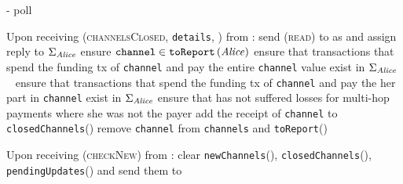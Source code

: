 \begin{systembox}{\fpaynet - poll}
\begin{algorithmic}[1]
    \State Upon receiving (\textsc{channelsClosed}, \texttt{details}, \alice)
    from \simulator:
    \Indent
      \State send (\textsc{read}) to \ledger{} as \alice{} and assign reply to
      $\Sigma_{\mathit{Alice}}$
        \State ensure $\mathtt{channel} \in
        \mathtt{toReport}\left(\mathit{Alice}\right)$
          \State ensure that transactions that spend the funding tx of
          \texttt{channel} and pay \alice{} the entire \texttt{channel} value
          exist in $\Sigma_{\mathit{Alice}}$
        \Else \ 
          \State ensure that transactions that spend the funding tx of
          \texttt{channel} and pay \alice{} the her part in \texttt{channel}
          exist in $\Sigma_{\mathit{Alice}}$
          \State ensure that \alice{} has not suffered losses for multi-hop
          payments where she was not the payer
        \EndIf
        \State add the receipt of \texttt{channel} to
        \texttt{closedChannels}(\alice)
        \State remove \texttt{channel} from \texttt{channels} and
        \texttt{toReport}(\alice)
      \EndFor
    \EndIndent
    \State

    \State Upon receiving (\textsc{checkNew}) from \alice:
    \Indent
      \State clear \texttt{newChannels}(\alice),
      \texttt{closedChannels}(\alice), \texttt{pendingUpdates}(\alice) and send
      them to \alice
    \EndIndent
    \State
  \end{algorithmic}
\end{systembox}
